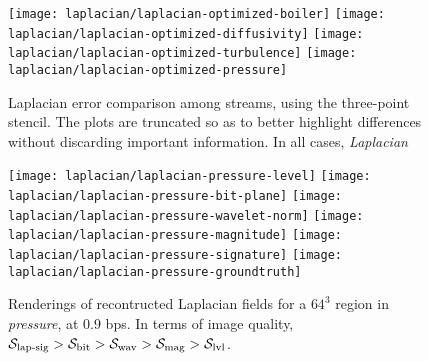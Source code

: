 \begin{figure*}[h]
\centering
{}
{\texttt{[image: laplacian/laplacian-optimized-boiler]}}
{\texttt{[image: laplacian/laplacian-optimized-diffusivity]}}
{\texttt{[image: laplacian/laplacian-optimized-turbulence]}}
{\texttt{[image: laplacian/laplacian-optimized-pressure]}}
\caption{Laplacian error comparison among streams, using the three-point 
stencil. The plots are truncated so as to better highlight differences without
discarding important information. In all cases, \emph{Laplacian}}
\label{fig:laplacian-error-comparison}
\vspace{1em}

\centering
{}
{\texttt{[image: laplacian/laplacian-pressure-level]}}
{\texttt{[image: laplacian/laplacian-pressure-bit-plane]}}
{\texttt{[image: laplacian/laplacian-pressure-wavelet-norm]}}
{\texttt{[image: laplacian/laplacian-pressure-magnitude]}}
{\texttt{[image: laplacian/laplacian-pressure-signature]}}
{\texttt{[image: laplacian/laplacian-pressure-groundtruth]}}
\caption{Renderings of recontructed Laplacian fields for a $64^3$ region in
\emph{pressure}, at 0.9 bps.  In terms of image quality, $\slsg > \sbit > \swav
> \smag > \slvl$.} \label{fig:laplacian-renderings}
\end{figure*}

